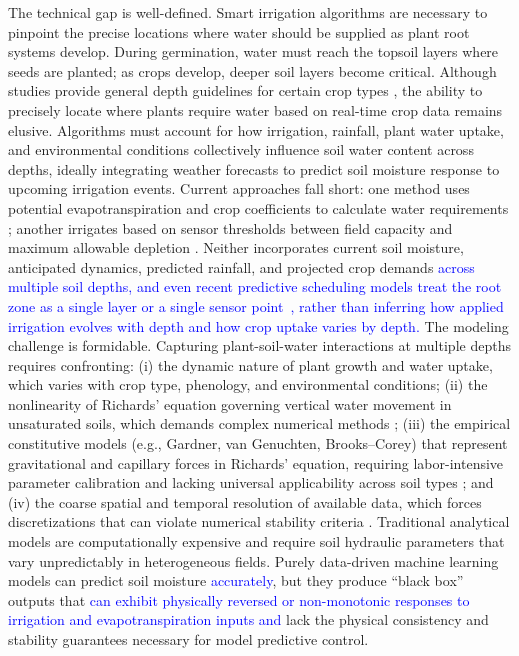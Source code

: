 \documentclass[pdflatex,sn-nature]{sn-jnl}%
\theoremstyle{thmstyleone}%
\theoremstyle{thmstyletwo}%
\theoremstyle{thmstylethree}%
\begin{document}
The technical gap is well-defined. Smart irrigation algorithms are necessary to pinpoint the precise locations where water should be supplied as plant root systems develop. During germination, water must reach the topsoil layers where seeds are planted; as crops develop, deeper soil layers become critical. Although studies provide general depth guidelines for certain crop types \cite{ASABE2021}, the ability to precisely locate where plants require water based on real-time crop data remains elusive. Algorithms must account for how irrigation, rainfall, plant water uptake, and environmental conditions collectively influence soil water content across depths, ideally integrating weather forecasts to predict soil moisture response to upcoming irrigation events. Current approaches fall short: one method uses potential evapotranspiration and crop coefficients to calculate water requirements \cite{Volk2024}; another irrigates based on sensor thresholds between field capacity and maximum allowable depletion \cite{zhang2021}. Neither incorporates current soil moisture, anticipated dynamics, predicted rainfall, and projected crop demands \textcolor{blue}{across multiple soil depths, and even recent predictive scheduling models treat the root zone as a single layer or a single sensor point~\cite{Bagheri2025, condeforecast2024}, rather than inferring how applied irrigation evolves with depth and how crop uptake varies by depth.}
The modeling challenge is formidable. Capturing plant-soil-water interactions at multiple depths requires confronting: (i) the dynamic nature of plant growth and water uptake, which varies with crop type, phenology, and environmental conditions; (ii) the nonlinearity of Richards' equation governing vertical water movement in unsaturated soils, which demands complex numerical methods \cite{Celia1990}; (iii) the empirical constitutive models (e.g., Gardner, van Genuchten, Brooks–Corey) that represent gravitational and capillary forces in Richards' equation, requiring labor-intensive parameter calibration and lacking universal applicability across soil types \cite{Pan2019}; and (iv) the coarse spatial and temporal resolution of available data, which forces discretizations that can violate numerical stability criteria \cite{Celia1990,leveque2007}. Traditional analytical models are computationally expensive and require soil hydraulic parameters that vary unpredictably in heterogeneous fields. Purely data-driven machine learning models can predict soil moisture \textcolor{blue}{accurately}, but they produce ``black box'' outputs that \textcolor{blue}{can exhibit physically reversed or non-monotonic responses to irrigation and evapotranspiration inputs and} lack the physical consistency and stability guarantees necessary for model predictive control.
\end{document}
